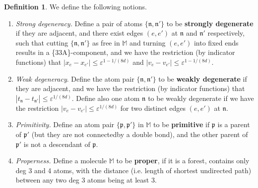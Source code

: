 \documentclass[10pt, reqno]{amsart}
\newcommand{\Mb}{\mathbb M}
\newcommand{\pf}{\mathfrak p}
\newcommand{\nf}{\mathfrak n}
\theoremstyle{definition}
\newtheorem{definition}[theorem]{Definition}
\theoremstyle{remark}
\numberwithin{equation}{section}
\begin{document}
\begin{definition}
\label{def.degen} We define the following notions.
\begin{enumerate}
\item \emph{Strong degeneracy.} Define a pair of atoms $\{\nf,\nf'\}$ to be \textbf{strongly degenerate} if they are adjacent, and there exist edges $(e,e')$ at $\nf$ and $\nf'$ respectively, such that cutting $\{\nf,\nf'\}$ as free in $\Mb$ and turning $(e,e')$ into fixed ends results in a \{33A\}-component, and we have the restriction (by indicator functions) that $|x_{e}-x_{e'}|\leq\varepsilon^{1-1/(8d)}$ and $|v_{e}-v_{e'}|\leq\varepsilon^{1-1/(8d)}$.
\item\emph{Weak degeneracy}. Define the atom pair $\{\nf,\nf'\}$ to be \textbf{weakly degenerate} if they are adjacent, and we have the restriction (by indicator functions) that $|t_{\nf}-t_{\nf'}|\leq \varepsilon^{1/(8d)}$. Define also one atom $\nf$ to be weakly degenerate if we have the restriction $|v_e-v_{e'}|\leq\varepsilon^{1/(8d)}$ for two distinct edges $(e,e')$ at $\nf$.
\item \emph{Primitivity.} Define an atom pair $\{\pf,\pf'\}$ in $\Mb$ to be \textbf{primitive} if $\pf$ is a parent of $\pf'$ (but they are not connectedby a double bond), and the other parent of $\pf'$ is not a descendant of $\pf$.
\item \emph{Properness.} Define a molecule $\Mb$ to be \textbf{proper}, if it is a forest, contains only deg 3 and 4 atoms, with the distance (i.e. length of shortest undirected path) between any two deg 3 atoms being at least 3.
\end{enumerate}
\end{definition}
\end{document}
